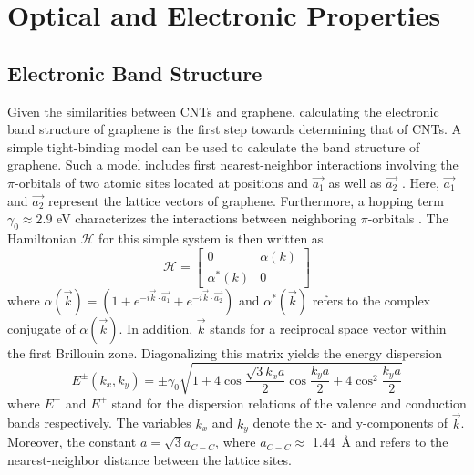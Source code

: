 \section{Optical and Electronic Properties}

\subsection{Electronic Band Structure}

Given the similarities between CNTs and graphene, calculating the electronic band structure of graphene is the first step towards determining that of CNTs. A simple tight-binding model can be used to calculate the band structure of graphene. Such a model includes first nearest-neighbor interactions involving the $\pi$-orbitals of two atomic sites located at positions and $\vec{a_1}$ as well as $\vec{a_2}$ \cite{charlier2007electronic}. Here, $\vec{a_1}$ and $\vec{a_2}$ represent the lattice vectors of graphene. Furthermore, a hopping term $\gamma_0 \approx 2.9$ eV  characterizes the interactions between neighboring $\pi$-orbitals \cite{charlier2007electronic}. The Hamiltonian $\mathcal{H}$ for this simple system is then written as 
\begin{equation}
	\mathcal{H} = \begin{bmatrix} 
	0 & \alpha(k) \\
	\alpha^*(k) & 0
	\end{bmatrix}
\end{equation}
where $\alpha(\vec{k}) = (1 + e^{-i \vec{k}\cdot \vec{a_1}} + e^{-i \vec{k}\cdot \vec{a_2}})$ and $\alpha^*(\vec{k})$ refers to the complex conjugate of $\alpha(\vec{k})$\cite{charlier2007electronic}. In addition, $\vec{k}$ stands for a reciprocal space vector within the first Brillouin zone. Diagonalizing this matrix yields the energy dispersion 
\begin{equation}
	E^{\pm} (k_x, k_y) = \pm \gamma_0 \sqrt{1 + 4 \cos\dfrac{\sqrt{3}k_x a}{2}\cos\dfrac{k_y a}{2} + 4 \cos^2 \dfrac{k_y a}{2}}
	\label{eq:graphene_band}
\end{equation} 
 where $E^-$ and $E^+$ stand for the dispersion relations of the valence and conduction bands respectively. The variables $k_x$ and $k_y$ denote the x- and y-components of $\vec{k}$. Moreover, the constant $a = \sqrt{3}a_{C-C}$, where $a_{C-C} \approx$ \SI{1.44}{\angstrom} and refers to the nearest-neighbor distance between the lattice sites. 

